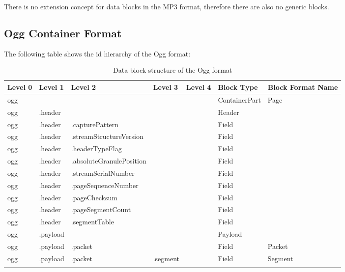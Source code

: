
There is no extension concept for data blocks in the MP3 format, therefore there are also no generic blocks.


\subsection{Ogg Container Format}
\label{sec:OggContainerFormat}

The following table shows the id hierarchy of the Ogg format:

\begin{longtable}{|p{}|p{}|p{}|p{}|p{}|p{}|p{}|}
	\hline
	Level 0 & Level 1 & Level 2 & Level 3 & Level 4 & Block Type & Block Format Name\\
	\endhead
	\hline
 	ogg & & & & & ContainerPart & Page\\
	\hline
 	ogg & .header & & & & Header & \\
	\hline
 	ogg & .header & .capturePattern & & & Field & \\
	\hline
 	ogg & .header & .streamStructureVersion & & & Field & \\
	\hline
 	ogg & .header & .headerTypeFlag & & & Field & \\
	\hline
 	ogg & .header & .absoluteGranulePosition & & & Field & \\
	\hline
 	ogg & .header & .streamSerialNumber & & & Field & \\
	\hline
 	ogg & .header & .pageSequenceNumber & & & Field & \\
	\hline
 	ogg & .header & .pageChecksum & & & Field & \\
	\hline
 	ogg & .header & .pageSegmentCount & & & Field & \\
	\hline
 	ogg & .header & .segmentTable & & & Field & \\
	\hline
 	ogg & .payload & & & & Payload & \\
	\hline
 	ogg & .payload & .packet & & & Field & Packet \\
	\hline
 	ogg & .payload & .packet & .segment & & Field & Segment\\
	\hline
	\caption{Data block structure of the Ogg format}
	\label{tab:DatablockstructureoftheOggformats}
\end{longtable}

